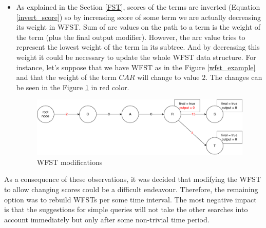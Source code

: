 \begin{itemize}
    \item As explained in the Section \ref{FST}, scores of the terms are inverted (Equation \ref{invert_score}) so by increasing score of some term
    we are actually decreasing its weight in WFST. Sum of arc values on the path to a term is the weight of the term (plus the final output modifier).
    However, the arc value tries to represent the lowest weight of the term in its subtree. And by decreasing this weight
    it could be necessary to update the whole WFST data structure. For instance, let's suppose that we have WFST as in the Figure \ref{wfst_example}
    and that the weight of the term $CAR$ will change to value $2$. The changes can be seen in the Figure \ref{wfst_modified} in red color.

    \begin{figure}[htbp]
    \centering
    \includegraphics[width=145mm]{../img/wfst_modified.pdf}
    \caption{WFST modifications}
    \label{wfst_modified}
    \end{figure}

\end{itemize}

As a consequence of these observations, it was decided that modifying the WFST to allow changing scores could be a difficult
endeavour. Therefore, the remaining option was to rebuild WFSTs per some time interval. The most negative impact is that the
suggestions for simple queries will not take the other searches into account immediately but only after some non-trivial time period.

